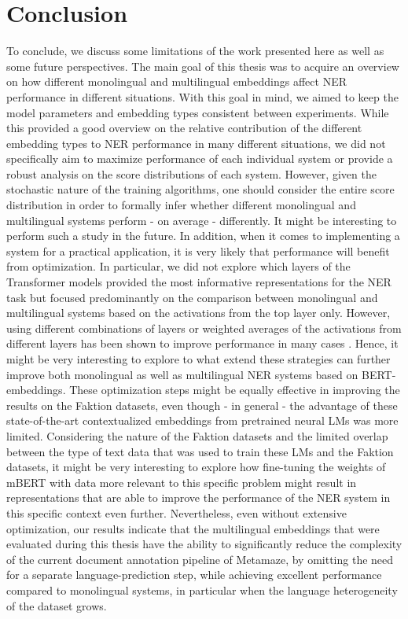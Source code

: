 \documentclass[12pt,a4paper,]{book}
\begin{document}
\hypertarget{conclusion}{%
\section{Conclusion}\label{conclusion}}

To conclude, we discuss some limitations of the work presented here as well as some future perspectives. The main goal of this thesis was to acquire an overview on how different monolingual and multilingual embeddings affect NER performance in different situations. With this goal in mind, we aimed to keep the model parameters and embedding types consistent between experiments. While this provided a good overview on the relative contribution of the different embedding types to NER performance in many different situations, we did not specifically aim to maximize performance of each individual system or provide a robust analysis on the score distributions of each system. However, given the stochastic nature of the training algorithms, one should consider the entire score distribution in order to formally infer whether different monolingual and multilingual systems perform - on average - differently. It might be interesting to perform such a study in the future. In addition, when it comes to implementing a system for a practical application, it is very likely that performance will benefit from optimization. In particular, we did not explore which layers of the Transformer models provided the most informative representations for the NER task but focused predominantly on the comparison between monolingual and multilingual systems based on the activations from the top layer only. However, using different combinations of layers or weighted averages of the activations from different layers has been shown to improve performance in many cases \citep{devlin2019, liu2019}. Hence, it might be very interesting to explore to what extend these strategies can further improve both monolingual as well as multilingual NER systems based on BERT-embeddings. These optimization steps might be equally effective in improving the results on the Faktion datasets, even though - in general - the advantage of these state-of-the-art contextualized embeddings from pretrained neural LMs was more limited. Considering the nature of the Faktion datasets and the limited overlap between the type of text data that was used to train these LMs and the Faktion datasets, it might be very interesting to explore how fine-tuning the weights of mBERT with data more relevant to this specific problem might result in representations that are able to improve the performance of the NER system in this specific context even further. Nevertheless, even without extensive optimization, our results indicate that the multilingual embeddings that were evaluated during this thesis have the ability to significantly reduce the complexity of the current document annotation pipeline of Metamaze, by omitting the need for a separate language-prediction step, while achieving excellent performance compared to monolingual systems, in particular when the language heterogeneity of the dataset grows.
\end{document}

